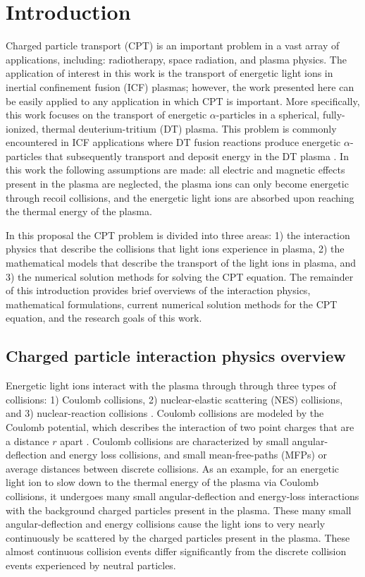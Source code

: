 \documentclass[../main.tex]{subfiles}
\begin{document}
\chapter{Introduction}
Charged particle transport (CPT) is an important problem in a vast array of applications, including: radiotherapy, space radiation, and plasma physics. The application of interest in this work is the transport of energetic light ions in inertial confinement fusion (ICF) plasmas; however, the work presented here can be easily applied to any application in which CPT is important. More specifically, this work focuses on the transport of energetic $\alpha$-particles in a spherical, fully-ionized, thermal deuterium-tritium (DT) plasma. This problem is commonly encountered in ICF applications where DT fusion reactions produce energetic $\alpha$-particles that subsequently transport and deposit energy in the DT plasma \cite{Bellan-2006}. In this work the following assumptions are made: all electric and magnetic effects present in the plasma are neglected, the plasma ions can only become energetic through recoil collisions, and the energetic light ions are absorbed upon reaching the thermal energy of the plasma.

In this proposal the CPT problem is divided into three areas: 1) the interaction physics that describe the collisions that light ions experience in plasma, 2) the mathematical models that describe the transport of the light ions in plasma, and 3) the numerical solution methods for solving the CPT equation. The remainder of this introduction provides brief overviews of the interaction physics, mathematical formulations, current numerical solution methods for the CPT equation, and the research goals of this work.

\section{Charged particle interaction physics overview}
Energetic light ions interact with the plasma through through three types of collisions: 1) Coulomb collisions, 2) nuclear-elastic scattering (NES) collisions, and 3) nuclear-reaction collisions \cite{Perkins-1981} \cite{Hale-1983}. Coulomb collisions are modeled by the Coulomb potential, which describes the interaction of two point charges that are a distance $r$ apart \cite{Bellan-2006}. Coulomb collisions are characterized by small angular-deflection and energy loss collisions, and small mean-free-paths (MFPs) or average distances between discrete collisions. As an example, for an energetic light ion to slow down to the thermal energy of the plasma via Coulomb collisions, it undergoes many small angular-deflection and energy-loss interactions with the background charged particles present in the plasma. These many small angular-deflection and energy collisions cause the light ions to very nearly continuously be scattered by the charged particles present in the plasma. These almost continuous collision events differ significantly from the discrete collision events experienced by neutral particles. 
\end{document}

